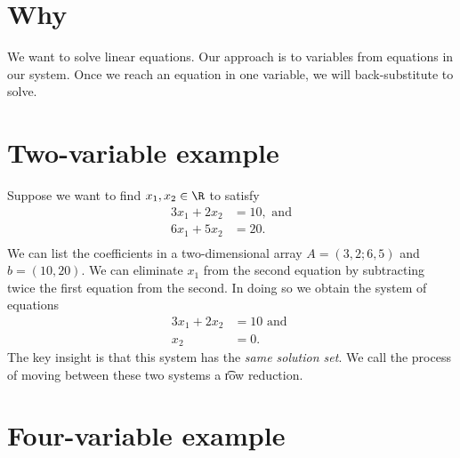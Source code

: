 

\section*{Why}

We want to solve linear equations.
Our approach is to  variables from equations in our system.
Once we reach an equation in one variable, we will back-substitute to solve.

\section*{Two-variable example}

Suppose we want to find $x_1, x_2 \in \R $ to satisfy
    \[
\begin{aligned}
3x_1 + 2x_2 &= 10, \text{ and} \\
6x_1 + 5x_2 &= 20. \\
\end{aligned}
    \]
We can list the coefficients in a two-dimensional array $A = (3, 2; 6, 5)$ and $b = (10,20)$.
We can eliminate $x_1$ from the second equation by subtracting twice the first equation from the second.
In doing so we obtain the system of equations
    \[
\begin{aligned}
3x_1 + 2x_2 &= 10 \text{ and } \\
x_2 &= 0.
\end{aligned}
    \]
The key insight is that this system has the \textit{same solution set}.
We call the process of moving between these two systems a \t{row reduction}.

\section*{Four-variable example}

